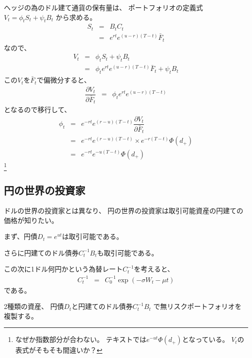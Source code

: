 \documentclass[uplatex,a4j,12pt,dvipdfmx]{jsarticle}
\begin{document}
ヘッジの為のドル建て通貨の保有量は、
ポートフォリオの定義式
$V_{t} = \phi_{t} S_{t} + \psi_{t} B_{t}$
から求める。
%
%
\begin{eqnarray*}
	S_{t}
	&=&
	B_{t} C_{t}
	\\ &=&
	e^{rt} e^{(u-r)(T-t)} \bar{F}_{t}
\end{eqnarray*}
%
%
なので、
%
%
\begin{eqnarray*}
	V_{t} &=& \phi_{t} S_{t} + \psi_{t} B_{t}
	\\ &=&
	\phi_{t} e^{rt} e^{(u-r)(T-t)} \bar{F}_{t} + \psi_{t} B_{t}
\end{eqnarray*}
%
%
この$V_{t}$を$\bar{F}_{t}$で偏微分すると、
%
%
\begin{eqnarray*}
	\dfrac{\partial V_{t}}{\partial \bar{F}_{t}}
	&=&
	\phi_{t} e^{rt} e^{(u-r)(T-t)}
\end{eqnarray*}
%
%
となるので移行して、
%
%
\begin{eqnarray*}
	\phi_{t}
	&=&
	e^{-rt} e^{(r-u)(T-t)}
	\dfrac{\partial V_{t}}{\partial \bar{F}_{t}}
	\\ &=&
	e^{-rt} e^{(r-u)(T-t)}
	\times
	e^{-r(T-t)}
	\Phi(d_{+})
	\\ &=&
	e^{-rt} e^{-u(T-t)}
	\Phi(d_{+})
\end{eqnarray*}
%
%
\footnote{なぜか指数部分が合わない。
	テキストでは$e^{-ut} \Phi(d_{+})$となっている。
	$V_{t}$の表式がそもそも間違いか？}

\subsection{円の世界の投資家}

ドルの世界の投資家とは異なり、
円の世界の投資家は取引可能資産の円建ての価格が知りたい。

まず、円債$D_{t} = e^{ut}$は取引可能である。

さらに円建てのドル債券$C^{-1}_{t} B_{t}$も取引可能である。

この次に1ドル何円かという為替レート$C^{-1}_{t}$を考えると、
%
%
\begin{eqnarray*}
	C^{-1}_{t}
	&=&
	C_{0}^{-1}
	\exp ( - \sigma W_{t} - \mu t )
\end{eqnarray*}
%
%
である。

2種類の資産、
円債$D_{t}$と円建てのドル債券$C^{-1}_{t} B_{t}$
で無リスクポートフォリオを複製する。
\end{document}
